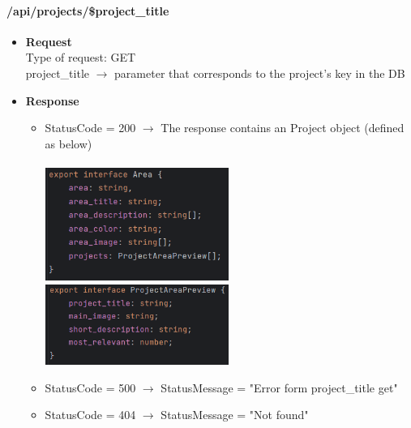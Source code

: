 \documentclass[11pt, letterpaper]{article}
\begin{document}
\paragraph{/api/projects/\$project\_title}
\begin{itemize}
    \item \textbf{Request} \\ Type of request: GET \\ project\_title $\rightarrow$ parameter that corresponds to the project's key in the DB 
    \item \textbf{Response} \begin{itemize}
        \item StatusCode = 200 $\rightarrow$ The response contains an Project object (defined as below) \\ \\
            \includegraphics[width=6cm]{images/API/Area.png} \includegraphics[width=6cm]{images/API/ProjectAreaPreview.png}
        \item StatusCode = 500 $\rightarrow$ StatusMessage = "Error form project\_title get"
        \item StatusCode = 404 $\rightarrow$ StatusMessage = "Not found"
    \end{itemize} 
\end{itemize}
\end{document}
